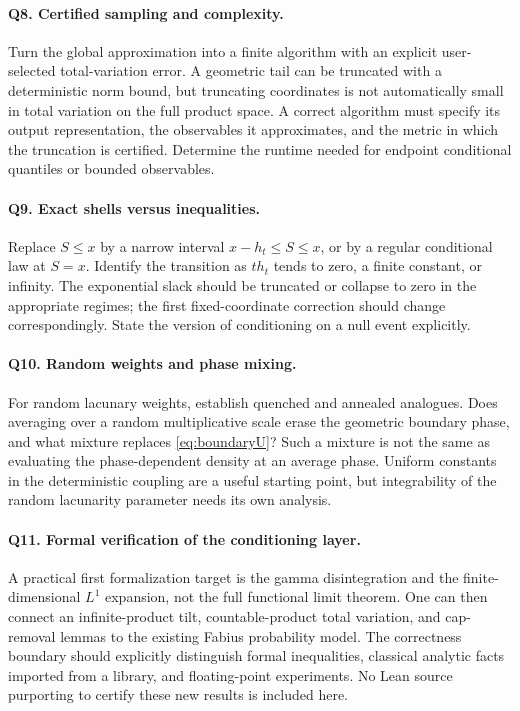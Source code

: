 \documentclass[11pt,letterpaper]{article}
\numberwithin{equation}{section}
\theoremstyle{definition}
\theoremstyle{remark}
\begin{document}
\paragraph{Q8. Certified sampling and complexity.}
Turn the global approximation into a finite algorithm with an explicit
user-selected total-variation error. A geometric tail can be truncated with
a deterministic norm bound, but truncating coordinates is not automatically
small in total variation on the full product space. A correct algorithm must
specify its output representation, the observables it approximates, and the
metric in which the truncation is certified. Determine the runtime needed
for endpoint conditional quantiles or bounded observables.

\paragraph{Q9. Exact shells versus inequalities.}
Replace $S\le x$ by a narrow interval $x-h_t\le S\le x$, or by a regular
conditional law at $S=x$. Identify the transition as $th_t$ tends to zero,
a finite constant, or infinity. The exponential slack should be truncated
or collapse to zero in the appropriate regimes; the first fixed-coordinate
correction should change correspondingly. State the version of conditioning
on a null event explicitly.

\paragraph{Q10. Random weights and phase mixing.}
For random lacunary weights, establish quenched and annealed analogues.
Does averaging over a random multiplicative scale erase the geometric
boundary phase, and what mixture replaces \eqref{eq:boundaryU}? Such a
mixture is not the same as evaluating the phase-dependent density at an
average phase. Uniform constants in the deterministic coupling are a useful
starting point, but integrability of the random lacunarity parameter needs
its own analysis.

\paragraph{Q11. Formal verification of the conditioning layer.}
A practical first formalization target is the gamma disintegration and the
finite-dimensional $L^1$ expansion, not the full functional limit theorem.
One can then connect an infinite-product tilt, countable-product total
variation, and cap-removal lemmas to the existing Fabius probability model.
The correctness boundary should explicitly distinguish formal inequalities,
classical analytic facts imported from a library, and floating-point
experiments. No Lean source purporting to certify these new results is
included here.
\end{document}
